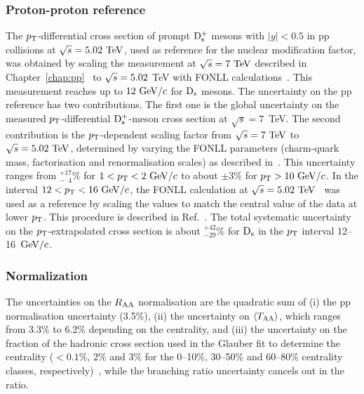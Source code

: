 \subsubsection{Proton-proton reference}
\label{sec:PPrefSyst}
The $p_{\rm T}$-differential cross section of prompt ${\rm D_s^+}$ mesons with 
$|y|<0.5$ in pp collisions at $\sqrt s=5.02~\mathrm{TeV}$, used as reference 
for the nuclear modification factor, was obtained by scaling the 
measurement at $\sqrt{s}=7~\mathrm{TeV}$ described in 
Chapter~\ref{chap:pp}~\cite{Acharya:2017jgo} to $\sqrt{s} = 5.02$ TeV 
with FONLL calculations~\cite{Cacciari:2012ny}. This measurement 
reaches up to $12~\mathrm{GeV}/c$ for ${\rm D_s}$ mesons.
The uncertainty on the pp reference 
has two contributions. The first one is the global uncertainty on the measured 
$p_{\rm T}$-differential ${\rm D_s^+}$-meson cross section at $\sqrt s=7$~TeV.
The second contribution is the $p_{\rm T}$-dependent scaling factor 
from $\sqrt{s}=7~\mathrm{TeV}$ to $\sqrt{s}=5.02~\mathrm{TeV}$, determined by varying
the FONLL parameters (charm-quark mass, factorisation and renormalisation scales) 
as described in~\cite{Averbeck:2011ga}. This uncertainty ranges from 
$^{+17}_{-\phantom{1}4}\%$ for $1<p_{\rm T}<2~\mathrm{GeV}/c$ to about $\pm3\%$ for $p_{\rm T}>10~\mathrm{GeV}/c$.
In the interval $12<p_{\rm T}<16~\mathrm{GeV}/c$, the FONLL calculation at 
$\sqrt s=5.02~\mathrm{TeV}$~\cite{Cacciari:2012ny} was used as a reference 
by scaling the values to match the central value of the data at lower $p_{\rm T}$. 
This procedure is described in Ref.~\cite{Adam:2015sza}. The total 
systematic uncertainty on the $p_{\rm T}$-extrapolated cross section is about 
$^{+42}_{-29}\%$ for ${\rm D_s}$ in the $p_{\rm T}$ interval 12--16~$\mathrm{GeV}/c$.


\subsubsection{Normalization}
\label{sec:NormalizSyst}
The uncertainties on the $R_{\rm AA}$ normalisation are the quadratic sum of 
(i) the pp normalisation uncertainty (3.5\%), 
(ii) the uncertainty on $\langle T_{\rm AA} \rangle$, which ranges from 3.3\% to 6.2\% depending on the centrality, and
(iii) the uncertainty on the fraction of the hadronic cross section used in the 
Glauber fit to determine the centrality ($<0.1\%$, $2\%$ and $3\%$ for the 0--10\%, 30--50\% 
and 60--80\% centrality classes, respectively)~\cite{Adam:2015sza}, while the branching ratio uncertainty cancels out in the 
ratio.


